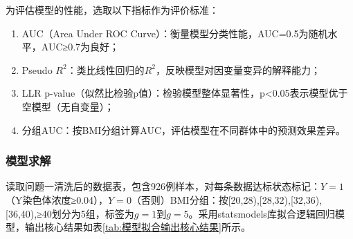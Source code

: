 \documentclass[withoutpreface,bwprint]{cumcmthesis} %
\begin{document}
为评估模型的性能，选取以下指标作为评价标准：
\begin{enumerate}
    \item AUC（Area Under ROC Curve）：衡量模型分类性能，AUC=0.5为随机水平，AUC≥0.7为良好；
    \item Pseudo $R^2$：类比线性回归的$R^2$，反映模型对因变量变异的解释能力；
    \item LLR p-value（似然比检验p值）：检验模型整体显著性，p<0.05表示模型优于空模型（无自变量）；
    \item 分组AUC：按BMI分组计算AUC，评估模型在不同群体中的预测效果差异。
\end{enumerate}
  

\subsubsection{模型求解}  
读取问题一清洗后的数据表，包含926例样本，对每条数据达标状态标记：$Y=1$（Y染色体浓度≥0.04），$Y=0$（否则）BMI分组：按[20,28),[28,32),[32,36),[36,40),≥40划分为5组，标签为$g=1$到$g=5$。采用statsmodels库拟合逻辑回归模型，输出核心结果如表\ref{tab:模型拟合输出核心结果}所示。
\end{document}
